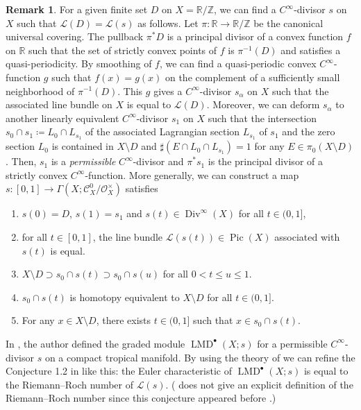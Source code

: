 \documentclass[a4paper,dvipdfmx,reqno,12pt]{amsart}
\theoremstyle{definition}
\newtheorem{remark}[theorem]{Remark}
\newcommand{\deq}{\coloneqq}
\newcommand{\opn}[1]{\operatorname{#1}}
\numberwithin{equation}{section}
\begin{document}
\begin{remark}
For a given finite set $D$ on
$X=\mathbb{R}/\mathbb{Z}$,
we can find a $C^{\infty}$-divisor $s$ on $X$
such that $\mathcal{L}(D)=\mathcal{L}(s)$ as follows.
Let $\pi\colon \mathbb{R}\to \mathbb{R}/\mathbb{Z}$
be the canonical universal covering.
The pullback $\pi^* D$ is a principal divisor 
of a convex function $f$ on $\mathbb{R}$ such that 
the set of strictly convex points of $f$ is $\pi^{-1}(D)$
and satisfies a quasi-periodicity.
By smoothing of $f$, we can find a quasi-periodic
convex $C^{\infty}$-function $g$ such that $f(x)=g(x)$ on 
the complement of a sufficiently 
small neighborhood of $\pi^{-1}(D)$. 
This $g$ gives a $C^{\infty}$-divisor $s_{\alpha}$ on
$X$ such that the associated line bundle on $X$ is equal
to $\mathcal{L}(D)$.
Moreover, we can deform $s_{\alpha}$ to another 
linearly equivalent 
$C^{\infty}$-divisor $s_{1}$ on $X$ such that 
the intersection $s_0\cap s_{1}\deq 
L_{0}\cap L_{s_{1}}$ of the associated 
Lagrangian section $L_{s_{1}}$
of $s_{1}$ and the zero section $L_0$ is contained in 
$X\setminus D$ and $\sharp (E\cap L_{0}\cap L_{s_{1}})=1$
for any $E\in \pi_0(X\setminus D)$.
Then, $s_{1}$ is a \emph{permissible} 
$C^{\infty}$-divisor and $\pi^{*}s_{1}$ is the 
principal divisor of a strictly convex
$C^{\infty}$-function.
More generally,
we can construct a map $s\colon [0,1]\to 
\Gamma (X;\mathcal{C}^{0}_X/\mathcal{O}_X^{\times})$ satisfies
\begin{enumerate}
\item $s(0)=D$, $s(1)=s_1$ and $s(t)\in \opn{Div}^{\infty}(X)$
for all $t\in (0,1]$,
\item for all $t\in [0,1]$, the line bundle
$\mathcal{L}(s(t))\in \opn{Pic}(X)$ associated with
$s(t)$ is equal. 
\item $X\setminus D\supset s_0\cap s(t)\supset s_0\cap s(u)$ for all $0<t\leq u \leq 1$.
\item $s_0\cap s(t)$ is homotopy equivalent to $X\setminus D$
for all $t\in (0,1]$.
\item For any $x\in X\setminus D$, there exists $t\in (0,1]$
such that $x\in s_0\cap s(t)$. 
\end{enumerate}

In \cite{tsutsui2023graded}, the author
defined the graded module $\opn{LMD}^{\bullet}(X;s)$
for a permissible $C^{\infty}$-divisor $s$ on
a compact tropical manifold.
By using the theory of \cite{demedrano2023chern}
we can refine the Conjecture 1.2 in 
\cite{tsutsui2023graded}
like this: the Euler characteristic of
$\opn{LMD}^{\bullet}(X;s)$ 
is equal to the Riemann--Roch number of 
$\mathcal{L}(s)$.
(\cite[Conjecture 1.2]{tsutsui2023graded} does not
give an explicit definition of the Riemann--Roch number
since this conjecture appeared before
\cite{demedrano2023chern}.)


\end{remark}
\end{document}
